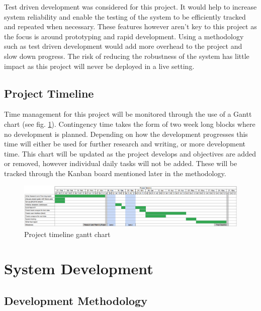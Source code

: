 \documentclass[12pt,titlepage]{article}
\begin{document}
  Test driven development was considered for this project. It would help to
  increase system reliability and enable the testing of the system to be
  efficiently tracked and repeated when necessary. These features however aren't
  key to this project as the focus is around prototyping and rapid development.
  Using a methodology such as test driven development would add more overhead to
  the project and slow down progress. The risk of reducing the robustness of the
  system has little impact as this project will never be deployed in a live
  setting.

  \subsection{Project Timeline}

  Time management for this project will be monitored through the use of a Gantt
  chart (see fig. \ref{fig:gantt}). Contingency time takes the form of two week
  long blocks where no development is planned. Depending on how the development
  progresses this time will either be used for further research and writing, or
  more development time. This chart will be updated as the project develops and
  objectives are added or removed, however individual daily tasks will not be
  added. These will be tracked through the Kanban board mentioned later in the
  methodology.

  \clearpage %

  \begin{figure}
    \includegraphics[width=\textheight]{../img/gantt.png}
    \caption{Project timeline gantt chart}
    \label{fig:gantt}
  \end{figure}

  \clearpage

\section{System Development}

  \subsection{Development Methodology}
\end{document}
